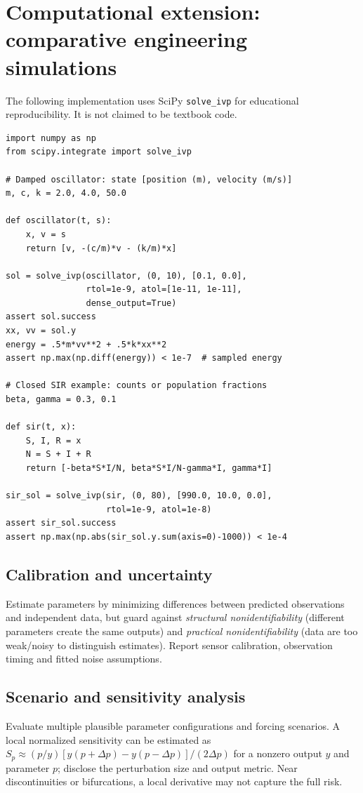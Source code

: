 \documentclass[11pt,letterpaper,oneside]{report}
\theoremstyle{definition}\newtheorem{definition}[theorem]{Definition}
\theoremstyle{remark}\newtheorem{remark}[theorem]{Remark}
\begin{document}
\chapter{Computational extension: comparative engineering simulations}
\begin{modern}The following implementation uses SciPy \texttt{solve\_ivp} for educational reproducibility. It is not claimed to be textbook code.\end{modern}
\begin{lstlisting}
import numpy as np
from scipy.integrate import solve_ivp

# Damped oscillator: state [position (m), velocity (m/s)]
m, c, k = 2.0, 4.0, 50.0

def oscillator(t, s):
    x, v = s
    return [v, -(c/m)*v - (k/m)*x]

sol = solve_ivp(oscillator, (0, 10), [0.1, 0.0],
                rtol=1e-9, atol=[1e-11, 1e-11],
                dense_output=True)
assert sol.success
xx, vv = sol.y
energy = .5*m*vv**2 + .5*k*xx**2
assert np.max(np.diff(energy)) < 1e-7  # sampled energy

# Closed SIR example: counts or population fractions
beta, gamma = 0.3, 0.1

def sir(t, x):
    S, I, R = x
    N = S + I + R
    return [-beta*S*I/N, beta*S*I/N-gamma*I, gamma*I]

sir_sol = solve_ivp(sir, (0, 80), [990.0, 10.0, 0.0],
                    rtol=1e-9, atol=1e-8)
assert sir_sol.success
assert np.max(np.abs(sir_sol.y.sum(axis=0)-1000)) < 1e-4
\end{lstlisting}
\section{Calibration and uncertainty}
Estimate parameters by minimizing differences between predicted observations and independent data, but guard against \emph{structural nonidentifiability} (different parameters create the same outputs) and \emph{practical nonidentifiability} (data are too weak/noisy to distinguish estimates). Report sensor calibration, observation timing and fitted noise assumptions.
\section{Scenario and sensitivity analysis}
Evaluate multiple plausible parameter configurations and forcing scenarios. A local normalized sensitivity can be estimated as $S_p\approx(p/y)[y(p+\Delta p)-y(p-\Delta p)]/(2\Delta p)$ for a nonzero output $y$ and parameter $p$; disclose the perturbation size and output metric. Near discontinuities or bifurcations, a local derivative may not capture the full risk.
\end{document}
